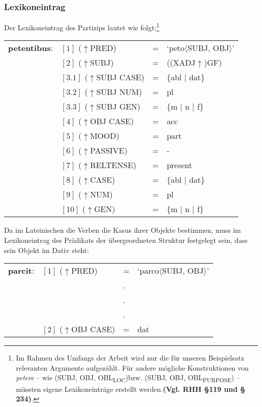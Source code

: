 \documentclass[12pt,a4paper]{article}
\begin{document}
\subsubsection{Lexikoneintrag}
Der Lexikoneintrag des Partizips lautet wie folgt:\footnote{Im Rahmen des Umfangs der Arbeit wird nur die für unseren Beispielsatz relevanten Argumente aufgezählt. Für andere mögliche Konstruktionen von \textit{petere} -- wie (SUBJ, OBJ, OBL\textsubscript{LOC})bzw. (SUBJ, OBJ, OBL\textsubscript{PURPOSE}) -- müssten eigene Lexikoneinträge erstellt werden.\textbf{(Vgl. RHH §119 und § 234)}.}
\begin{singlespace}
\begin{tabular}{ l  l  l  l  } 
\textbf{petentibus}: & $[1]$ \:  ($\uparrow$PRED) & = & `peto$\langle$SUBJ, OBJ$\rangle$' \\
$\qquad$ & $[2]$ \:  ($\uparrow$SUBJ) & = & ((XADJ$\uparrow$)GF)\\
$\qquad$ & $[3.1]$ \:  ($\uparrow$SUBJ CASE) & = & \{abl $\mid$ dat\} \\
$\qquad$ & $[3.2]$ \:  ($\uparrow$SUBJ NUM) & = & pl \\
$\qquad$ & $[3.3]$ \:  ($\uparrow$SUBJ GEN) & = & \{m $\mid$ n $\mid$ f\} \\
$\qquad$ & $[4]$ \:  ($\uparrow$OBJ CASE) & = & acc \\
$\qquad$ & $[5]$ \:  ($\uparrow$MOOD) & = & part\\
$\qquad$ & $[6]$ \:  ($\uparrow$PASSIVE) & = & - \\
$\qquad$ & $[7]$ \:  ($\uparrow$RELTENSE) & = & present \\ 
$\qquad$ & $[8]$ \:  ($\uparrow$CASE) & = & \{abl $\mid$ dat\} \\
$\qquad$ & $[9]$ \:  ($\uparrow$NUM) & = & pl \\
$\qquad$ & $[10]$ \:  ($\uparrow$GEN) & = & \{m $\mid$ n $\mid$ f\} \\
\end{tabular}
\newline
\newline
\end{singlespace}

Da im Lateinischen die Verben die Kasus ihrer Objekte bestimmen, muss im Lexikoneintrag des Prädikats der übergeordneten Struktur festgelegt sein, dass sein Objekt im Dativ steht: \\
\begin{singlespace}
\begin{tabular}{ l  l  l  l  } 
\textbf{parcit}: & $[1]$ \:  ($\uparrow$PRED) & = & `parco$\langle$SUBJ, OBJ$\rangle$' \\
$\qquad$ & $\qquad$ & . \\
$\qquad$ & $\qquad$ & . \\
$\qquad$ & $\qquad$ & . \\
$\qquad$ & $[2]$ \:  ($\uparrow$OBJ CASE) & = & dat \\
\end{tabular}
\newline
\newline
\end{singlespace}
\end{document}

